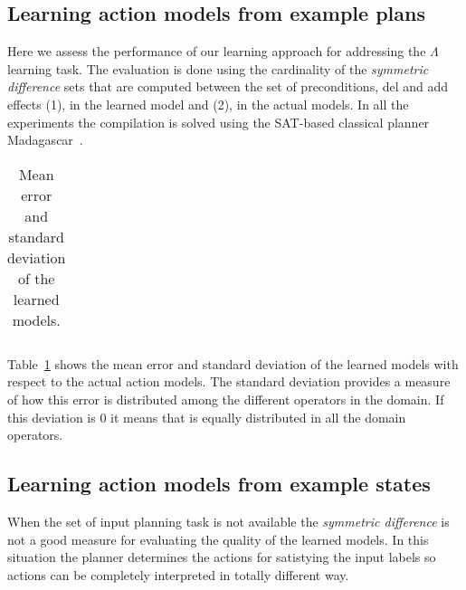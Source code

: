 \documentclass[letterpaper]{article} %
\begin{document}
\subsection{Learning action models from example plans}
Here we assess the performance of our learning approach for addressing the $\Lambda$ learning task. The evaluation is done using the cardinality of the {\em symmetric difference} sets that are computed between the set of preconditions, del and add effects (1), in the learned model and (2), in the actual models. In all the experiments the compilation is solved using the SAT-based classical planner {\sc Madagascar}~\cite{rintanen2014madagascar}.

\begin{table}[]
\begin{footnotesize}
\begin{tabular}{l||c|c|c||c|c|c||c|c|c}


\end{tabular}
\end{footnotesize}
\caption{\small Mean error and standard deviation of the learned models.}
  \label{tab:eplans}
\end{table}

Table~\ref{tab:eplans} shows the mean error and standard deviation of the learned models with respect to the actual action models. The standard deviation provides a measure of how this error is distributed among the different operators in the domain. If this deviation is 0 it means that is equally distributed in all the domain operators.


\subsection{Learning action models from example states}
When the set of input planning task is not available the {\em symmetric difference} is not a good measure for evaluating the quality of the learned models. In this situation the planner determines the actions for satistying the input labels so actions can be completely interpreted in totally different way. 


\end{document}
